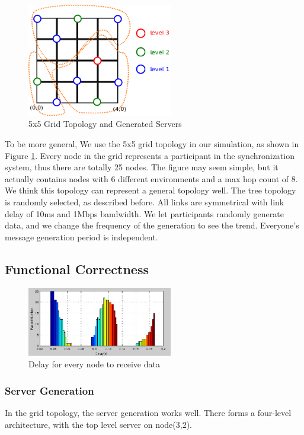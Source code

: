 \documentclass[conference]{IEEEtran}
\begin{document}
\begin{figure}[!t]
\centering
\includegraphics[width=2.5in]{../png/paper-topo.png}
\caption{5x5 Grid Topology and Generated Servers}
\label{paper_topo}
\end{figure}
To be more general, We use the 5x5 grid topology in our simulation,
as shown in Figure \ref{paper_topo}.
Every node in the grid represents a participant in the synchronization system,
thus there are totally 25 nodes.
The figure may seem simple,
but it actually contains nodes with 6 different environments and a max hop count of 8.
We think this topology can represent a general topology well.
The tree topology is randomly selected, as described before.
All links are symmetrical with link delay of 10ms and 1Mbps bandwidth.
We let participants randomly generate data,
and we change the frequency of the generation to see the trend.
Everyone's message generation period is independent.

\subsection{Functional Correctness}
\begin{figure}[!t]
\centering
\includegraphics[width=2.5in]{../png/function-delay.png}
\caption{Delay for every node to receive data}
\label{function_delay}
\end{figure}
\subsubsection{Server Generation}
In the grid topology, the server generation works well.
There forms a four-level architecture, with the top level server on node(3,2).
\end{document}
